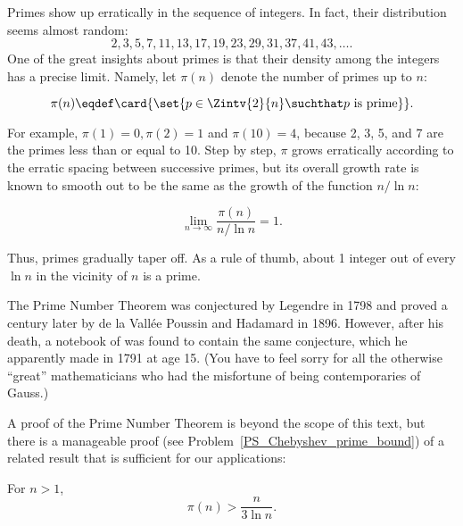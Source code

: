 Primes show up erratically in the sequence of integers.  In fact,
their distribution seems almost random:
\[
2, 3, 5, 7, 11, 13, 17, 19, 23, 29, 31, 37, 41, 43, \dots.
\]
One of the great insights about primes is that their density among the
integers has a precise limit.  Namely, let $\pi(n)$ denote the number
of primes up to $n$:

\begin{definition}\label{def:prime<x}
\[
  \pi(n) \eqdef \card{\set{p \in \Zintv{2}{n} \suchthat p \text{ is
        prime}}}.
\]
\end{definition}

For example, $\pi(1) = 0, \pi(2) = 1$ and $\pi(10) = 4$, because 2, 3,
5, and 7 are the primes less than or equal to 10.  Step by step,
$\pi$ grows erratically according to the erratic spacing between
successive primes, but its overall growth rate is known to smooth out
to be the same as the growth of the function $n/\ln n$:

\begin{theorem}%
\[
\lim_{n\to\infty} \frac{\pi(n)}{n/\ln n} = 1.
\]
\end{theorem}

Thus, primes gradually taper off.  As a rule of thumb, about 1 integer
out of every $\ln n$ in the vicinity of $n$ is a prime.


The Prime Number Theorem was conjectured by Legendre in 1798 and
proved a century later by de la Vall\'{e}e Poussin and Hadamard in 1896.
However, after his death, a notebook of  was found to contain the
same conjecture, which he apparently made in 1791 at age 15.  (You
have to feel sorry for all the otherwise ``great'' mathematicians who
had the misfortune of being contemporaries of Gauss.)

A proof of the Prime Number Theorem is beyond the scope of this text,
but there is a manageable proof (see
Problem~\ref{PS_Chebyshev_prime_bound}) of a related result that is
sufficient for our applications:
\begin{theorem}
For $n >1$,
\[
\pi(n) > \frac{n}{3 \ln n}.
\]
\end{theorem}

